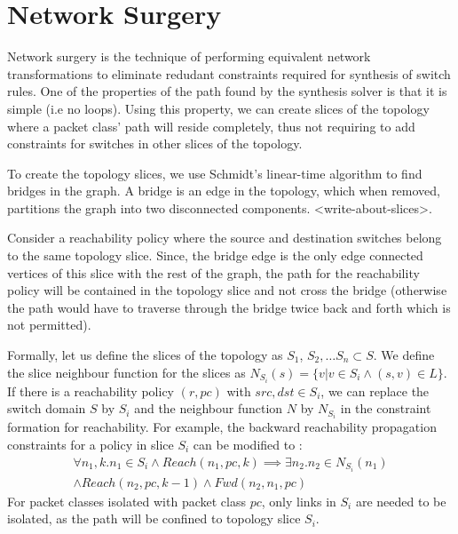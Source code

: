 \section{Network Surgery}
Network surgery is the technique of performing equivalent network transformations to eliminate redudant constraints required for synthesis of switch rules. One of the properties of the path found by the synthesis solver is that it is simple (i.e no loops). Using this property, we can create slices of the topology where a packet class' path will reside completely, thus not requiring to add constraints for switches in other slices of the topology. 

To create the topology slices, we use Schmidt's linear-time algorithm\cite{schmidt} to find bridges in the graph. A bridge is an edge in the topology, which when removed, partitions the graph into two disconnected components. <write-about-slices>. 

Consider a reachability policy where the source and destination switches belong to the same topology slice. Since, the bridge edge is the only edge connected vertices of this slice with the rest of the graph, the path for the reachability policy will be contained in the topology slice and not cross the bridge (otherwise the path would have to traverse through the bridge twice back and forth which is not permitted). 

Formally, let us define the slices of the topology as $S_1$, $S_2, \ldots S_n \subset S$. We define the slice neighbour function for the slices as $N_{S_i}(s) = \{v | v \in S_i \wedge (s,v) \in L\}$. If there is a reachability policy $(r, pc)$ with $src,dst \in S_i$, we can replace the switch domain $S$ by $S_i$ and the neighbour function $N$ by $N_{S_i}$ in the constraint formation for reachability. For example, the backward reachability propagation constraints for a policy in slice $S_i$ can be modified to : 
\begin{multline}
\forall n_1,k.  n_1 \in S_i \wedge Reach(n_1,pc,k) \implies \exists n_2. n_2 \in N_{S_i}(n_1) \\ \wedge  Reach(n_2,pc,k-1) \wedge Fwd(n_2,n_1,pc)
\end{multline}
For packet classes isolated with packet class $pc$, only links in $S_i$ are needed to be isolated, as the path will be confined to topology slice $S_i$. 

